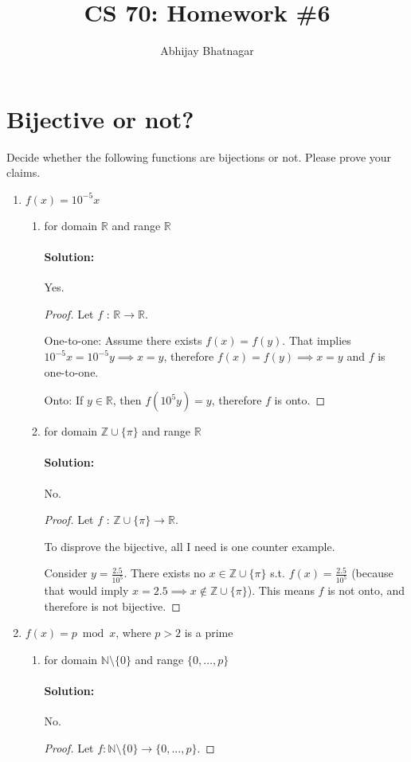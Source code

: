 \documentclass[11pt, notitlepage]{report}
\makeatletter
\newcommand{\N}{\mathbb{N}}
\newcommand{\R}{\mathbb{R}}
\newcommand{\Question}[1]{\newpage\section{#1}}
\newenvironment{solution}{\paragraph{Solution:}}{\hfill}
\newcommand*{\toccontents}{\@starttoc{toc}}
\makeatother
\begin{document}
   \title{CS 70: Homework \#6}
   \author{Abhijay Bhatnagar}
   \maketitle
   \toccontents



\setcounter{secnumdepth}{0} %

\Question{Bijective or not?}

Decide whether the following functions are bijections or not. Please prove your claims.
\begin{enumerate}[label=\alph*.)]

    \item $f(x) = 10^{-5}x$
    \begin{enumerate}[label=(\roman*)]
        \item for domain $\mathbb R$ and range $\mathbb R$
        \begin{solution}
        	Yes.
        	\begin{proof} Let $f$ : $\R\rightarrow\R$.
        		
        		One-to-one: Assume there exists $f(x)=f(y)$. That implies $10^{-5}x=10^{-5}y\implies x=y$, therefore $f(x)=f(y)\implies x=y$ and $f$ is one-to-one.
        		
        		Onto: If $y\in \R$, then $f(10^5y)=y$, therefore $f$ is onto.
        		
        	\end{proof}
        \end{solution}
        \item for domain $\mathbb Z \cup \{\pi\}$ and range $\mathbb R$
        \begin{solution}
        	No.
        	\begin{proof} Let $f$ : $\mathbb Z \cup \{\pi\}\rightarrow\R$.
        		
        		To disprove the bijective, all I need is one counter example.
        		
        		Consider $y=\frac{2.5}{10^{5}}$. There exists no $x\in \mathbb Z \cup \{\pi\}$ s.t. $f(x)=\frac{2.5}{10^{5}}$ (because that would imply $x=2.5\implies x\not\in \mathbb Z \cup \{\pi\}$). This means $f$ is not onto, and therefore is not bijective.
        	\end{proof}
        \end{solution}
    \end{enumerate}

    \item $f(x) = p \bmod x$, where $p > 2$ is a prime
    \begin{enumerate}[label=(\roman*)]
        \item for domain $\mathbb N \setminus \{0\}$ and range $\{0, \dots, p\}$ 
        \begin{solution} No.
       	\begin{proof}
       		Let $f : \N \setminus \{0\} \rightarrow \{0,...,p\}$. 
       		

\end{proof}
\end{solution}
\end{enumerate}
\end{enumerate}
\end{document}
